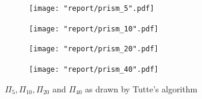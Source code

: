 \documentclass[11pt]{report}
\begin{document}
\begin{figure}[H]
    \begin{subfigure}{.5\textwidth}
        \texttt{[image: "report/prism\_5".pdf]}
    \end{subfigure}
    \begin{subfigure}{.5\textwidth}
        \texttt{[image: "report/prism\_10".pdf]}
    \end{subfigure}
    \begin{subfigure}{.5\textwidth}
        \texttt{[image: "report/prism\_20".pdf]}
    \end{subfigure}
    \begin{subfigure}{.5\textwidth}
        \texttt{[image: "report/prism\_40".pdf]}
    \end{subfigure}
    \caption{$\Pi_5, \Pi_{10}, \Pi_{20}$ and $\Pi_{40}$ as drawn by Tutte's algorithm}
\end{figure}
\end{document}
